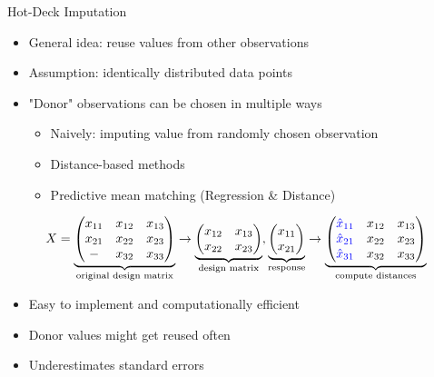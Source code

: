 \documentclass[aspectratio=43]{beamer}
\newcommand\pro{\item[$+$]}
\newcommand\con{\item[$-$]}
\begin{document}
\begin{frame}{Hot-Deck Imputation}
\begin{itemize}
	\item General idea: reuse values from other observations
	\item Assumption: identically distributed data points
	\item "Donor" observations can be chosen in multiple ways
	\begin{itemize}
		\item Naively: imputing value from randomly chosen observation
		\item Distance-based methods
		\item Predictive mean matching (Regression \& Distance)
	\end{itemize}
\end{itemize}
$$X = \underbrace{\begin{pmatrix}
	x_{11} 	& x_{12} 	& x_{13} \\
	x_{21} 	& x_{22} 	& x_{23} \\
	- 		& x_{32} 	& x_{33} \\
	\end{pmatrix}}_\text{original design matrix}
\rightarrow
\underbrace{
	\begin{pmatrix}
	x_{12} 	& x_{13} \\
	x_{22} 	& x_{23} \\
	\end{pmatrix}
}_\text{design matrix},
\underbrace{\begin{pmatrix}
	x_{11} \\
	x_{21} \\
	\end{pmatrix}}_\text{response}
\rightarrow
\underbrace{
	\begin{pmatrix}
	\textcolor{blue}{\hat{x}_{11}}		& x_{12} 	& x_{13} \\
	\textcolor{blue}{\hat{x}_{21}} 		& x_{22} 		& x_{23} \\
	\textcolor{blue}{\hat{x}_{31}} & x_{32} 	& x_{33} \\
	\end{pmatrix}}_\text{compute distances}
$$

\begin{itemize}
	\pro Easy to implement and computationally efficient
\end{itemize}
\begin{itemize}
	\con Donor values might get reused often
	\con Underestimates standard errors
\end{itemize}
\end{frame}
\end{document}
